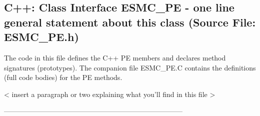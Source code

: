  
\parskip        0pt
\parindent      0pt
\baselineskip  11pt
 
\def\bv{\begin{verbatim}}
\def\ev{\end{verbatim}}
\def\be{\begin{equation}}
\def\ee{\end{equation}}
\def\bea{\begin{eqnarray}}
\def\eea{\end{eqnarray}}
\def\bi{\begin{itemize}}
\def\ei{\end{itemize}}
\def\bn{\begin{enumerate}}
\def\en{\end{enumerate}}
\def\bd{\begin{description}}
\def\ed{\end{description}}
\def\({\left (}
\def\){\right )}
\def\[{\left [}
\def\]{\right ]}
\def\<{\left  \langle}
\def\>{\right \rangle}
\def\cI{{\cal I}}
\def\diag{\mathop{\rm diag}}
\def\tr{\mathop{\rm tr}}


 
\subsection{C++:  Class Interface ESMC\_PE - one line general statement about this class (Source File: ESMC\_PE.h)}


  
  
   The code in this file defines the C++ PE members and declares method 
   signatures (prototypes).  The companion file ESMC\_PE.C contains
   the definitions (full code bodies) for the PE methods.
  
   < insert a paragraph or two explaining what you'll find in this file >
  
  -----------------------------------------------------------------------------
   
